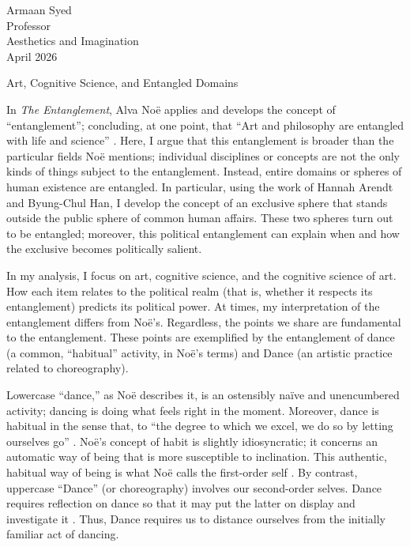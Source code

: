 \documentclass[12pt,letterpaper]{article}
\begin{document}
\noindent Armaan Syed\\
\noindent Professor\\
\noindent Aesthetics and Imagination\\
 April 2026

{\centering Art, Cognitive Science, and Entangled Domains\par}


In \textit{The Entanglement}, Alva Noë applies and develops the concept of
``entanglement''; concluding, at one point, that ``Art and philosophy are
entangled with life and science'' \autocite[202]{noeEntanglement2023}. Here, I
argue that this entanglement is broader than the particular fields Noë mentions;
individual disciplines or concepts are not the only kinds of things subject to
the entanglement. Instead, entire domains or spheres of human existence are
entangled. In particular, using the work of Hannah Arendt and Byung-Chul Han, I
develop the concept of an exclusive sphere that stands outside the public sphere
of common human affairs. These two spheres turn out to be entangled; moreover,
this political entanglement can explain when and how the exclusive becomes
politically salient.

In my analysis, I focus on art, cognitive science, and the cognitive science of
art. How each item relates to the political realm (that is, whether it respects
its entanglement) predicts its political power. At times, my interpretation of
the entanglement differs from Noë's. Regardless, the points we share are
fundamental to the entanglement. These points are exemplified by the
entanglement of dance (a common, ``habitual'' activity, in Noë's terms) and
Dance (an artistic practice related to choreography).

Lowercase ``dance,'' as Noë describes it, is an ostensibly naïve and
unencumbered activity; dancing is doing what feels right in the moment.
Moreover, dance is habitual in the sense that, to ``the degree to which we
excel, we do so by letting ourselves go'' \autocite[27]{noeEntanglement2023}.
Noë's concept of habit is slightly idiosyncratic; it concerns an automatic way
of being that is more susceptible to inclination. This authentic, habitual way
of being is what Noë calls the first-order self
\autocite[19]{noeEntanglement2023}.  By contrast, uppercase ``Dance'' (or
choreography) involves our second-order selves. Dance requires reflection on
dance so that it may put the latter on display and investigate it
\autocite[29]{noeEntanglement2023}. Thus, Dance requires us to distance
ourselves from the initially familiar act of dancing.
\end{document}
